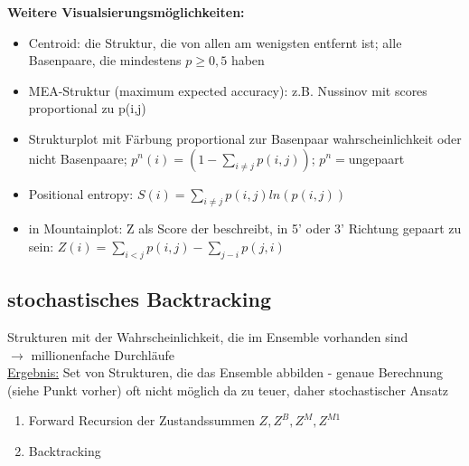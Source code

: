 \textbf{Weitere Visualsierungsmöglichkeiten:}
\begin{itemize}
	\item Centroid: die Struktur, die von allen am wenigsten entfernt ist; alle Basenpaare, die mindestens $p \geq 0,5$ haben
	\item MEA-Struktur (maximum expected accuracy): z.B. Nussinov mit scores proportional zu p(i,j)
	\item Strukturplot mit Färbung proportional zur Basenpaar wahrscheinlichkeit oder nicht Basenpaare; $p^n(i)=(1- \sum \limits_{i \neq j} p(i,j))$; $p^n=$ungepaart
	\item Positional entropy: $S(i)=\sum \limits_{i \neq j} p(i,j)ln(p(i,j))$
	\item in Mountainplot: Z als Score der beschreibt, in 5' oder 3' Richtung gepaart zu sein: $Z(i)=\sum \limits_{i<j}p(i,j) - \sum \limits_{j-i}p(j,i)$
\end{itemize}

\newpage

\subsection{stochastisches Backtracking}
Strukturen mit der Wahrscheinlichkeit, die im Ensemble vorhanden sind\\
$\rightarrow$ millionenfache Durchläufe\\
\underline{Ergebnis:} Set von Strukturen, die das Ensemble abbilden
 - genaue Berechnung (siehe Punkt vorher) oft nicht möglich da zu teuer, daher stochastischer Ansatz
 
\begin{enumerate}
	\item Forward Recursion der Zustandssummen $Z, Z^B, Z^M, Z^{M1}$
	\item Backtracking
\end{enumerate}

